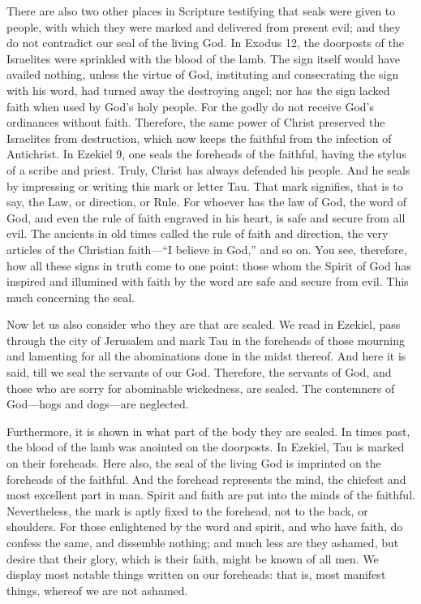 There are also two other places in Scripture testifying that seals were given to people, with which they were marked and delivered from present evil; and they do not contradict our seal of the living God. In Exodus 12, the doorposts of the Israelites were sprinkled with the blood of the lamb. The sign itself would have availed nothing, unless the virtue of God, instituting and consecrating the sign with his word, had turned away the destroying angel; nor has the sign lacked faith when used by God’s holy people. For the godly do not receive God’s ordinances without faith. Therefore, the same power of Christ preserved the Israelites from destruction, which now keeps the faithful from the infection of Antichrist. In Ezekiel 9, one seals the foreheads of the faithful, having the stylus of a scribe and priest. Truly, Christ has always defended his people. And he seals by impressing or writing this mark or letter Tau. That mark signifies, that is to say, the Law, or direction, or Rule. For whoever has the law of God, the word of God, and even the rule of faith engraved in his heart, is safe and secure from all evil. The ancients in old times called the rule of faith and direction, the very articles of the Christian faith—“I believe in God,” and so on. You see, therefore, how all these signs in truth come to one point: those whom the Spirit of God has inspired and illumined with faith by the word are safe and secure from evil. This much concerning the seal.

Now let us also consider who they are that are sealed. We read in Ezekiel, pass through the city of Jerusalem and mark Tau in the foreheads of those mourning and lamenting for all the abominations done in the midst thereof. And here it is said, till we seal the servants of our God. Therefore, the servants of God, and those who are sorry for abominable wickedness, are sealed. The contemners of God—hogs and dogs—are neglected.

Furthermore, it is shown in what part of the body they are sealed. In times past, the blood of the lamb was anointed on the doorposts. In Ezekiel, Tau is marked on their foreheads. Here also, the seal of the living God is imprinted on the foreheads of the faithful. And the forehead represents the mind, the chiefest and most excellent part in man. Spirit and faith are put into the minds of the faithful. Nevertheless, the mark is aptly fixed to the forehead, not to the back, or shoulders. For those enlightened by the word and spirit, and who have faith, do confess the same, and dissemble nothing; and much less are they ashamed, but desire that their glory, which is their faith, might be known of all men. We display most notable things written on our foreheads: that is, most manifest things, whereof we are not ashamed.

